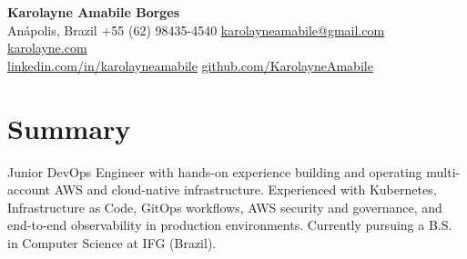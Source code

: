 \documentclass[a4paper,10pt]{article}
\begin{document}
\begin{center}
    {\LARGE \textbf{Karolayne Amabile Borges}}
    \\ [0.1cm]
    Anápolis, Brazil
    {\textbullet}
    +55 (62) 98435-4540
    {\textbullet}
    \href{mailto:karolayneamabile@gmail.com}{karolayneamabile@gmail.com}
    {\textbullet}
    \href{https://karolayne.com}{karolayne.com}
    \\
    \href{https://linkedin.com/in/karolayneamabile}{linkedin.com/in/karolayneamabile}
    {\textbullet}
    \href{https://github.com/KarolayneAmabile}{github.com/KarolayneAmabile}
\end{center}


\section{Summary}

Junior DevOps Engineer with hands-on experience building and operating multi-account AWS and
cloud-native infrastructure. Experienced with Kubernetes, Infrastructure as Code, GitOps workflows,
AWS security and governance, and end-to-end observability in production environments. Currently
pursuing a B.S. in Computer Science at IFG (Brazil).

\end{document}
